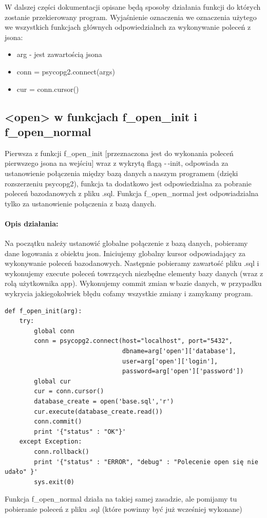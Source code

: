 \documentclass{article}
\begin{document}
W dalszej części dokumentacji opisane będą sposoby działania funkcji do których zostanie przekierowany program.
Wyjaśnienie oznaczenia we oznaczenia użytego we wszystkich funkcjach głównych odpowiedzialnch za wykonywanie poleceń z jsona:
\begin{itemize}
    \item arg - jest zawartością jsona
    \item conn = psycopg2.connect(args)
    \item cur = conn.cursor()
\end{itemize}







\newpage
\subsection{<open> w funkcjach f\_open\_init i f\_open\_normal}
Pierwsza z funkcji f\_open\_init [przeznaczona jest do wykonania poleceń pierwszego jsona na wejściu] wraz z wykrytą flagą -\,-init, odpowiada za ustanowienie połączenia między bazą danych a\,naszym programem (dzięki rozszerzeniu psycopg2), funkcja ta dodatkowo jest odpowiedzialna za pobranie poleceń bazodanowych z pliku .sql. Funkcja f\_open\_normal jest odpowiadzialna tylko za ustanowienie połączenia z bazą danych.
\paragraph{Opis działania: }
    Na początku należy ustanowić globalne połączenie z bazą danych,
    pobieramy dane logowania z obiektu json. Iniciujemy globalny
    kursor odpowiadający za wykonywanie poleceń bazodanowych. 
    Następnie pobieramy zawartość pliku .sql i wykonujemy execute 
    poleceń towrzących niezbędne elementy bazy danych (wraz z rolą użytkownika app).
    Wykonujemy commit zmian w\,bazie danych, w przypadku wykrycia 
    jakiegokolwiek błędu cofamy wszystkie zmiany i zamykamy program.
\begin{verbatim}
def f_open_init(arg):
    try:
        global conn
        conn = psycopg2.connect(host="localhost", port="5432",
                                dbname=arg['open']['database'],
                                user=arg['open']['login'],
                                password=arg['open']['password'])
        global cur
        cur = conn.cursor()
        database_create = open('base.sql','r') 
        cur.execute(database_create.read())
        conn.commit()
        print '{"status" : "OK"}'
    except Exception:
        conn.rollback()
        print '{"status" : "ERROR", "debug" : "Polecenie open się nie udało" }' 
        sys.exit(0)  
\end{verbatim}
Funkcja f\_open\_normal działa na takiej samej zasadzie, ale pomijamy tu pobieranie poleceń z pliku .sql (które powinny być już wcześniej wykonane)
\end{document}
